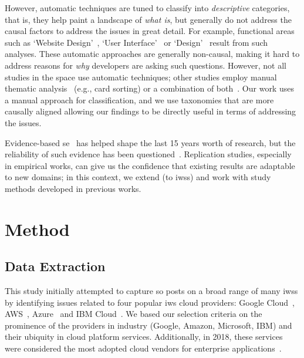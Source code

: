 However, automatic techniques are tuned to classify into \textit{descriptive} categories, that is, they help paint a landscape of \textit{what is}, but generally do not address the causal factors to address the issues in great detail. For example, functional areas such as `Website Design'~\citep{Barua:2012gz}, `User Interface'~\citep{Beyer:2014ec} or `Design'~\citep{Uddin:2015hn} result from such analyses. These automatic approaches are generally non-causal, making it hard to address reasons for \textit{why} developers are asking such questions. However, not all studies in the space use automatic techniques; other studies employ manual thematic analysis~\citep{Tahir:2018ks,Aghajani:2019bo,Barzilay:2013cn} (e.g., card sorting) or a combination of both~\citep{Beyer:2018fm,Beyer:2014ec,Rosen:2016uk,Treude:2011fh}. Our work uses a manual approach for classification, and we use taxonomies that are more causally aligned allowing our findings to be directly useful in terms of addressing the issues.

Evidence-based \gls{se}~\citep{Kitchenham:2004vj} has helped shape the last 15 years worth of research, but the reliability of such evidence has been questioned~\citep{rgensen:2016gl,Juristo:2012bp,Shepperd:2018hr}.
Replication studies, especially in empirical works, can give us the confidence that existing results are adaptable to new domains; in this context, we extend (to \glspl{iws}) and work with study methods developed in previous works.

\section{Method}
\label{icse2020:sec:method}

\subsection{Data Extraction}

This study initially attempted to capture \gls{so} posts on a broad range of many \glspl{iws} by identifying issues related to four popular \gls{iws} cloud providers: Google Cloud~, AWS~, Azure~ and IBM Cloud~.
We based our selection criteria on the prominence of the providers in industry (Google, Amazon, Microsoft, IBM) and their ubiquity in cloud platform services. Additionally, in 2018, these services were considered the most adopted cloud vendors for enterprise applications~\citep{RightScaleInc:2018kJ}.


